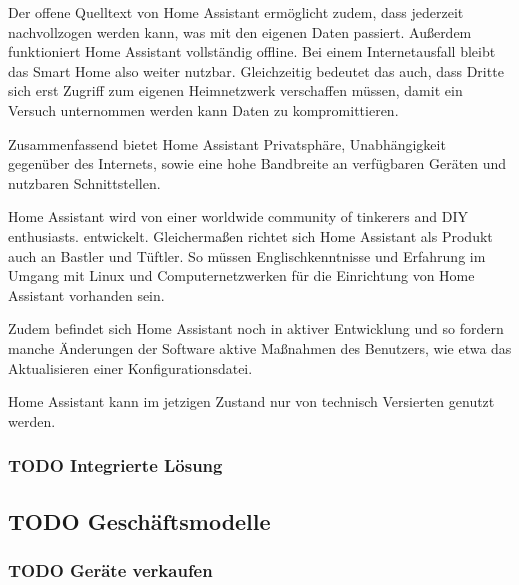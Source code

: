 Der offene Quelltext von Home Assistant ermöglicht zudem, dass jederzeit nachvollzogen werden kann, was mit den eigenen Daten passiert.
Außerdem funktioniert Home Assistant vollständig offline.
Bei einem Internetausfall bleibt das Smart Home also weiter nutzbar.
Gleichzeitig bedeutet das auch, dass Dritte sich erst Zugriff zum eigenen Heimnetzwerk verschaffen müssen, damit ein Versuch unternommen werden kann Daten zu kompromittieren.

Zusammenfassend bietet Home Assistant Privatsphäre, Unabhängigkeit gegenüber des Internets, sowie eine hohe Bandbreite an verfügbaren Geräten und nutzbaren Schnittstellen.

Home Assistant wird von einer \glqq worldwide community of tinkerers and DIY enthusiasts.\grqq{} entwickelt.
Gleichermaßen richtet sich Home Assistant als Produkt auch an Bastler und Tüftler.
So müssen Englischkenntnisse und Erfahrung im Umgang mit Linux und Computernetzwerken für die Einrichtung von Home Assistant vorhanden sein.

Zudem befindet sich Home Assistant noch in aktiver Entwicklung und so fordern manche Änderungen der Software aktive Maßnahmen des Benutzers, wie etwa das Aktualisieren einer Konfigurationsdatei.

Home Assistant kann im jetzigen Zustand nur von technisch Versierten genutzt werden.

\subsubsection{\textbf{TODO} Integrierte Lösung} %


\subsection{\textbf{TODO} Geschäftsmodelle}



\subsubsection{\textbf{TODO} Geräte verkaufen} %

